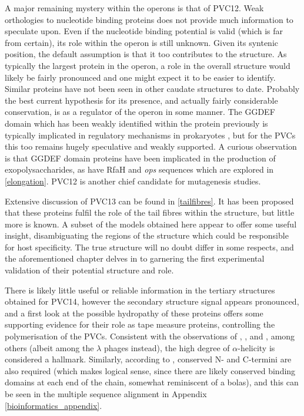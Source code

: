 A major remaining mystery within the operons is that of PVC12. Weak orthologies to nucleotide binding proteins does not provide much information to speculate upon. Even if the nucleotide binding potential is valid (which is far from certain), its role within the operon is still unknown. Given its syntenic position, the default assumption is that it too contributes to the structure. As typically the largest protein in the operon, a role in the overall structure would likely be fairly pronounced and one might expect it to be easier to identify. Similar proteins have not been seen in other caudate structures to date. Probably the best current hypothesis for its presence, and actually fairly considerable conservation, is as a regulator of the operon in some manner. The GGDEF domain which has been weakly identified within the protein previously is typically implicated in regulatory mechanisms in prokaryotes \citep{Paul2004, Ryjenkov2005}, but for the PVCs this too remains hugely speculative and weakly supported. A curious observation is that GGDEF domain proteins have been implicated in the production of exopolysaccharides, as have RfaH and \emph{ops} sequences which are explored in \vref{elongation}. PVC12 is another chief candidate for mutagenesis studies.

Extensive discussion of PVC13 can be found in \vref{tailfibres}. It has been proposed that these proteins fulfil the role of the tail fibres within the structure, but little more is known. A subset of the models obtained here appear to offer some useful insight, disambiguating the regions of the structure which could be responsible for host specificity. The true structure will no doubt differ in some respects, and the aforementioned chapter delves in to garnering the first experimental validation of their potential structure and role.

There is likely little useful or reliable information in the tertiary structures obtained for PVC14, however the secondary structure signal appears pronounced, and a first look at the possible hydropathy of these proteins offers some supporting evidence for their role as tape measure proteins, controlling the polymerisation of the PVCs. Consistent with the observations of \cite{Rybakova2015}, \cite{Mahony2016}, and \cite{Katsura1984}, among others (albeit among the $\lambda$ phages instead), the high degree of $\alpha$-helicity is considered a hallmark. Similarly, according to \cite{Mahony2016}, conserved N- and C-termini are also required (which makes logical sense, since there are likely conserved binding domains at each end of the chain, somewhat reminiscent of a bolas), and this can be seen in the multiple sequence alignment in Appendix \vref{bioinformatics_appendix}.

